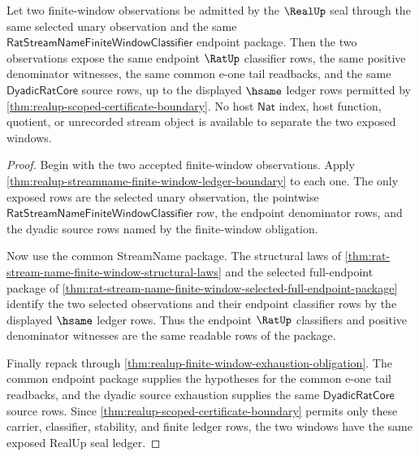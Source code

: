 \begin{theorem}
\label{thm:realup-streamname-window-determinacy-boundary}
Let two finite-window observations be admitted by the $\RealUp$ seal through
the same selected unary observation and the same
$\mathsf{RatStreamNameFiniteWindowClassifier}$ endpoint package. Then the two
observations expose the same endpoint $\RatUp$ classifier rows, the same
positive denominator witnesses, the same common e-one tail readbacks, and the
same $\mathsf{DyadicRatCore}$ source rows, up to the displayed $\hsame$ ledger
rows permitted by \autoref{thm:realup-scoped-certificate-boundary}. No host
$\mathsf{Nat}$ index, host function, quotient, or unrecorded stream object is
available to separate the two exposed windows.
\end{theorem}
\begin{proof}
Begin with the two accepted finite-window observations. Apply
\autoref{thm:realup-streamname-finite-window-ledger-boundary} to each one. The
only exposed rows are the selected unary observation, the pointwise
$\mathsf{RatStreamNameFiniteWindowClassifier}$ row, the endpoint denominator
rows, and the dyadic source rows named by the finite-window obligation.

Now use the common StreamName package. The structural laws of
\autoref{thm:rat-stream-name-finite-window-structural-laws} and the selected
full-endpoint package of
\autoref{thm:rat-stream-name-finite-window-selected-full-endpoint-package}
identify the two selected observations and their endpoint classifier rows by
the displayed $\hsame$ ledger rows. Thus the endpoint $\RatUp$ classifiers and
positive denominator witnesses are the same readable rows of the package.

Finally repack through
\autoref{thm:realup-finite-window-exhaustion-obligation}. The common endpoint
package supplies the hypotheses for the common e-one tail readbacks, and the
dyadic source exhaustion supplies the same $\mathsf{DyadicRatCore}$ source
rows. Since \autoref{thm:realup-scoped-certificate-boundary} permits only these
carrier, classifier, stability, and finite ledger rows, the two windows have
the same exposed RealUp seal ledger.
\end{proof}

